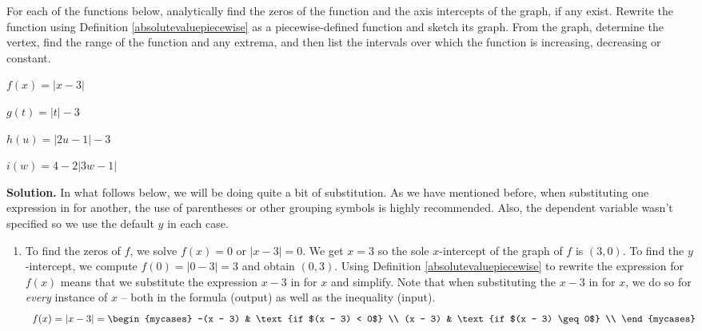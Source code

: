 \begin{ex}   \label{absvaluegraph1} For each of the functions below, analytically find the zeros of the function and the axis intercepts of the graph, if any exist.  Rewrite the function using Definition \ref{absolutevaluepiecewise} as a piecewise-defined function and sketch its graph.  From the graph, determine the vertex, find the range of the function and any extrema, and then list the intervals over which the function is increasing, decreasing or constant.

\begin{enumerate}
\begin{multicols}{4}

\item  $f(x) = |x - 3|$
\item  $g(t) = |t| - 3$
\item  $h(u) = |2u - 1| - 3$
\item  $i(w) = 4 - 2|3w - 1|$ 

\end{multicols}
\end{enumerate}

{\bf Solution.}  In what follows below, we will be doing quite a bit of substitution.  As we have mentioned before, when substituting one expression in for another, the use of parentheses or other grouping symbols is highly recommended.  Also, the dependent variable wasn't specified so we use the default $y$ in each case.

\begin{enumerate}

\item  To find the zeros of $f$, we solve $f(x) = 0$ or $|x - 3| = 0$.  We get $x = 3$ so  the sole $x$-intercept of the graph of $f$ is $(3, 0)$.  To find the $y$-intercept, we compute $f(0) = |0 - 3| = 3$ and obtain $(0,3)$.     Using Definition \ref{absolutevaluepiecewise} to rewrite the expression for $f(x)$ means that we substitute the expression $x - 3$ in for $x$ and simplify.  Note that when substituting the $x - 3$ in for $x$,  we do so for \textit{every} instance of $x$  -- both in the formula (output) as well as the inequality (input). \[ \begin{array}{ccc}

f(x) = |x - 3| = \begin{mycases} 
      -(x - 3) &  \text{if $(x - 3) < 0$} \\
      (x - 3)  & \text{if $(x - 3) \geq 0$} \\
   \end{mycases} &
   

\end{array}\]
\end{enumerate}
\end{ex}
